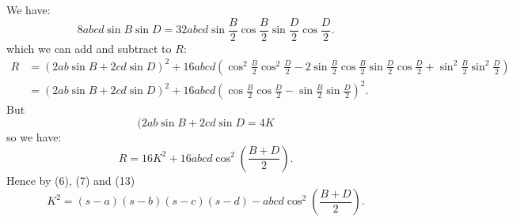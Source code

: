 \documentclass[12pt]{article}
\begin{document}
We have:
$$
8abcd\sin B \sin D= 32 abcd \sin \frac{B}{2} \cos \frac{B}{2} \sin \frac{D}{2} \cos \frac{D}{2}.
$$
which we can add and subtract to $R$:
\begin{align}
R & = (2ab\sin B + 2cd \sin D)^2 + 16abcd(\cos^2 \frac{B}{2}\cos^2\frac{D}{2} - 2\sin \frac{B}{2} \cos \frac{B}{2} \sin \frac{D}{2} \cos \frac{D}{2} + \sin^2 \frac{B}{2} \sin^2 \frac{D}{2}) \\
 & = (2ab\sin B + 2cd \sin D)^2 + 16abcd( \cos \frac{B}{2} \cos \frac{D}{2} - \sin \frac{B}{2} \sin \frac{D}{2})^2 .
\end{align}
But 
$$
 (2ab \sin B + 2cd \sin D = 4K
$$
so we have:
\begin{equation}
R =16K^2 + 16abcd\cos^2 \left ( \frac{B+D}{2}\right).
\end{equation}
Hence by (6), (7) and (13)
\begin{equation}
K^2 = (s-a)(s-b)(s-c)(s-d) - abcd \cos^2 \left ( \frac{B+D}{2}\right).
\end{equation}
\end{document}
